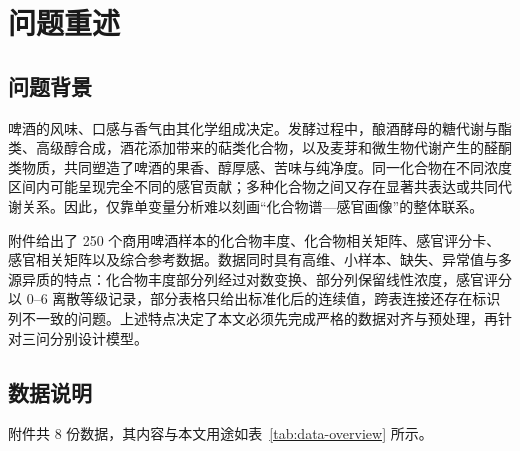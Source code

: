 
\section{问题重述}

\subsection{问题背景}

啤酒的风味、口感与香气由其化学组成决定。发酵过程中，酿酒酵母的糖代谢与酯类、高级醇合成，酒花添加带来的萜类化合物，以及麦芽和微生物代谢产生的醛酮类物质，共同塑造了啤酒的果香、醇厚感、苦味与纯净度\citep{vanderhaegen2006chemistry}。同一化合物在不同浓度区间内可能呈现完全不同的感官贡献；多种化合物之间又存在显著共表达或共同代谢关系。因此，仅靠单变量分析难以刻画“化合物谱—感官画像”的整体联系。

附件给出了 250 个商用啤酒样本的化合物丰度、化合物相关矩阵、感官评分卡、感官相关矩阵以及综合参考数据。数据同时具有高维、小样本、缺失、异常值与多源异质的特点：化合物丰度部分列经过对数变换、部分列保留线性浓度，感官评分以 0--6 离散等级记录，部分表格只给出标准化后的连续值，跨表连接还存在标识列不一致的问题。上述特点决定了本文必须先完成严格的数据对齐与预处理，再针对三问分别设计模型。

\subsection{数据说明}

附件共 8 份数据，其内容与本文用途如表~\ref{tab:data-overview} 所示。

